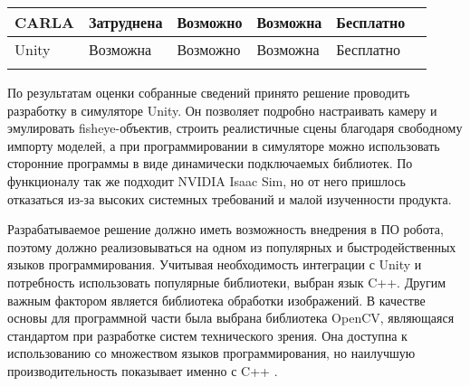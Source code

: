 \begin{table}[H]
\begin{tabular}{|l|l|l|l|l|l|}
    CARLA             & Затруднена                                                                  & Возможно                                                                       & Возможна                                                            & Бесплатно            &                     \\ \hline
    Unity             & Возможна                                                                    & Возможно                                                                       & Возможна                                                            & Бесплатно            &                     \\ \hline
                      &                                                                             &                                                                                &                                                                     &                      &                     \\ \hline
    \end{tabular}
\end{table}

По результатам оценки собранные сведений принято решение проводить разработку в симуляторе Unity. Он позволяет подробно настраивать камеру и эмулировать fisheye-объектив, 
строить реалистичные сцены благодаря свободному импорту моделей, а при программировании в симуляторе можно использовать сторонние программы в виде динамически подключаемых библиотек. 
По функционалу так же подходит NVIDIA Isaac Sim, но от него пришлось отказаться из-за высоких системных требований и малой изученности продукта.     %

Разрабатываемое решение должно иметь возможность внедрения в ПО робота, %
поэтому должно реализовываться на одном из популярных и быстродейственных языков программирования. Учитывая необходимость интеграции с Unity и потребность использовать популярные 
библиотеки, выбран язык C++.  Другим важным фактором является библиотека обработки изображений. В качестве основы для программной части была выбрана библиотека OpenCV, являющаяся стандартом 
при разработке систем технического зрения. Она доступна к использованию со множеством языков программирования, но наилучшую производительность показывает именно с C++ \cite{}.                              %